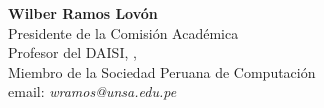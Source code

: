 \begin{center}
\textbf{Wilber Ramos Lovón}\\
Presidente de la Comisión Académica\\
Profesor del DAISI, \University, \city\\
Miembro de la Sociedad Peruana de Computación\\
email: \textit{wramos@unsa.edu.pe}
\end{center}
